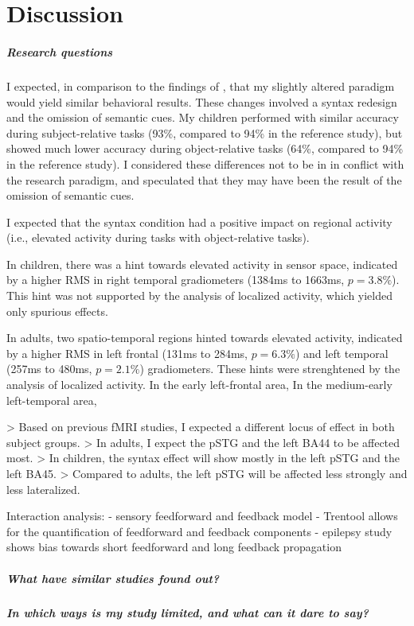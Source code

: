 \chapter{Discussion}

\paragraph{Research questions}

I expected, in comparison to the findings of \cite{2.1}, that my slightly altered paradigm would yield similar behavioral results.
These changes involved a syntax redesign and the omission of semantic cues.
My children performed with similar accuracy during subject-relative tasks (93\%, compared to 94\% in the reference study), but showed much lower accuracy during object-relative tasks (64\%, compared to 94\% in the reference study).
I considered these differences not to be in in conflict with the research paradigm, and speculated that they may have been the result of the omission of semantic cues.


I expected that the syntax condition had a positive impact on regional activity (i.e., elevated activity during tasks with object-relative tasks).

In children, there was a hint towards elevated activity in sensor space, indicated by a higher RMS in right temporal gradiometers (1384ms to 1663ms, $p = 3.8\%$).
This hint was not supported by the analysis of localized activity, which yielded only spurious effects.

In adults, two spatio-temporal regions hinted towards elevated activity, indicated by a higher RMS in left frontal (131ms to 284ms, $p = 6.3\%$) and left temporal (257ms to 480ms, $p = 2.1\%$) gradiometers. 
These hints were strenghtened by the analysis of localized activity.
In the early left-frontal area, 
In the medium-early left-temporal area, 

> Based on previous fMRI studies, I expected a different locus of effect in both subject groups.
> In adults, I expect the pSTG and the left BA44 to be affected most.
> In children, the syntax effect will show mostly in the left pSTG and the left BA45.
> Compared to adults, the left pSTG will be affected less strongly and less lateralized.


Interaction analysis:
- sensory feedforward and feedback model
- Trentool allows for the quantification of feedforward and feedback components
- epilepsy study shows bias towards short feedforward and long feedback propagation

\paragraph{What have similar studies found out?}

\paragraph{In which ways is my study limited, and what can it dare to say?}